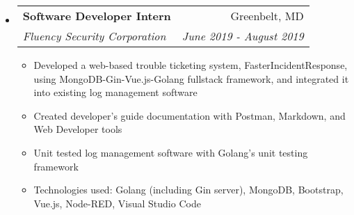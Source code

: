 \documentclass[letterpaper,10pt]{article}
\makeatletter
\newcommand{\resitem}[1]{\item #1 \vspace{-3.5pt}}
\newcommand{\ressubheading}[4]{
\begin{tabular*}{7.0in}{l@{\extracolsep{\fill}}r}
		\textbf{#1} & #2 \\
		\textit{#3} & \textit{#4} \\
\end{tabular*}\vspace{-6pt}}
\makeatother
\begin{document}
\begin{itemize}
\item
    \ressubheading{Software Developer Intern}{Greenbelt, MD}{Fluency Security Corporation}{June 2019 - August 2019}
	\begin{itemize}
	    \resitem{Developed a web-based trouble ticketing system, FasterIncidentResponse, using MongoDB-Gin-Vue.js-Golang fullstack framework, and integrated it into existing log management software}
		\resitem{Created developer's guide documentation with Postman, Markdown, and Web Developer tools}
		\resitem{Unit tested log management software with Golang's unit testing framework}
		\resitem{Technologies used: Golang (including Gin server), MongoDB, Bootstrap, Vue.js, Node-RED, Visual Studio Code}
	\end{itemize}
	


\end{itemize}
\end{document}
